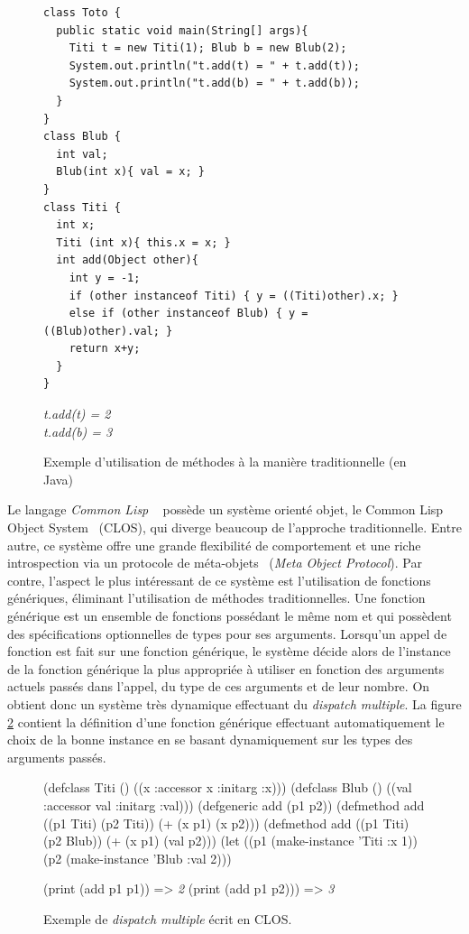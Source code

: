 \documentclass[12pt,oneside,letterpaper,francais]{book}
\newcommand{\clisp}{{\textit{Common Lisp }}}
\newcommand{\schemeresult}[1]{{\it #1}}
\begin{document}
\begin{figure}[htb!]
  \begin{verbatim}
class Toto {
  public static void main(String[] args){
    Titi t = new Titi(1); Blub b = new Blub(2);
    System.out.println("t.add(t) = " + t.add(t));
    System.out.println("t.add(b) = " + t.add(b));
  }
} 
class Blub {
  int val;
  Blub(int x){ val = x; }
}
class Titi {
  int x;
  Titi (int x){ this.x = x; }
  int add(Object other){
    int y = -1;
    if (other instanceof Titi) { y = ((Titi)other).x; }
    else if (other instanceof Blub) { y = ((Blub)other).val; }
    return x+y;
  }
}
  \end{verbatim}
  {{\it
t.add(t) = 2\\
t.add(b) = 3
  }}
  \caption{Exemple d'utilisation de méthodes à la manière
    traditionnelle (en Java)}
  \label{OO:JavaDispatch}
\end{figure}


Le langage \clisp~\cite{CLISP} possède un système orienté objet, le
Common Lisp Object System~\cite{CLOS} (CLOS), qui diverge beaucoup de
l'approche traditionnelle. Entre autre, ce système offre une grande
flexibilité de comportement et une riche introspection via un
protocole de méta-objets~\cite{MOP} (\textit{Meta Object
  Protocol}). Par contre, l'aspect le plus intéressant de ce système
est l'utilisation de fonctions génériques, éliminant l'utilisation de
méthodes traditionnelles. Une fonction générique est un ensemble de
fonctions possédant le même nom et qui possèdent des spécifications
optionnelles de types pour ses arguments. Lorsqu'un appel de fonction
est fait sur une fonction générique, le système décide alors de
l'instance de la fonction générique la plus appropriée à utiliser en
fonction des arguments actuels passés dans l'appel, du type de ces
arguments et de leur nombre. On obtient donc un système très dynamique
effectuant du \textit{dispatch multiple}. La figure \ref{OO:CLOS_ex}
contient la définition d'une fonction générique effectuant
automatiquement le choix de la bonne instance en se basant
dynamiquement sur les types des arguments passés.

\begin{figure}[htb!]
  \begin{schemecode}
(defclass Titi () ((x :accessor x :initarg :x)))
(defclass Blub () ((val :accessor val :initarg :val)))
(defgeneric add (p1 p2))
(defmethod add ((p1 Titi) (p2 Titi)) (+ (x p1) (x p2)))
(defmethod add ((p1 Titi) (p2 Blub)) (+ (x p1) (val p2)))
(let ((p1 (make-instance 'Titi :x 1))
      (p2 (make-instance 'Blub :val 2)))

  (print (add p1 p1))  => \schemeresult{2}
  (print (add p1 p2))) => \schemeresult{3}
  \end{schemecode}
  \caption{Exemple de \textit{dispatch multiple} écrit en CLOS.}
  \label{OO:CLOS_ex}
\end{figure}
\end{document}
